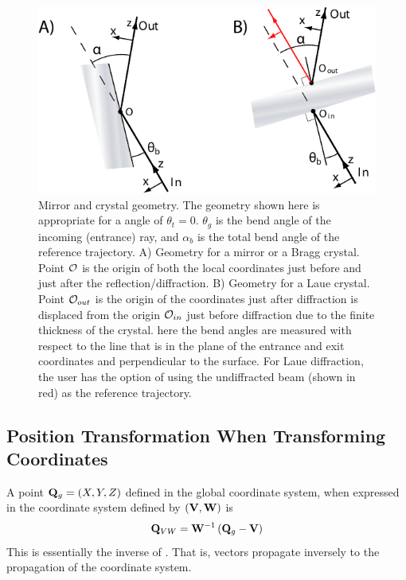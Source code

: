 \begin{figure}
  \centering \includegraphics{mirror.pdf} 
\caption[Mirror and crystal geometry] {Mirror and crystal geometry.  The geometry shown here is
appropriate for a  angle of $\theta_t = 0$.  $\theta_g$ is the bend angle of the
incoming (entrance) ray, and $\alpha_b$ is the total bend angle of the reference trajectory. A)
Geometry for a mirror or a Bragg crystal. Point ${\cal O}$ is the origin of both the local coordinates
just before and just after the reflection/diffraction. B) Geometry for a Laue crystal.  Point
${\cal O}_{out}$ is the origin of the coordinates just after diffraction is displaced from the origin
${\cal O}_{in}$ just before diffraction due to the finite thickness of the crystal. here the bend
angles are measured with respect to the line that is in the plane of the entrance and exit
coordinates and perpendicular to the surface. For Laue diffraction, the user has the option of using
the undiffracted beam (shown in red) as the reference trajectory.
  }  
  \label{f:mirror}
\end{figure}

\subsection{Position Transformation When Transforming Coordinates}
\label{s:pos.trans}

A point ${\bf Q}_g = (X, Y, Z)$ defined in the global coordinate system, when expressed in the
coordinate system defined by $({\bf V}, {\bf W})$ is
\begin{equation}
  {\bf Q}_{VW} = {\bf W}^{-1} \left( {\bf Q}_g - {\bf V} \right)
  \label{rwrv}
\end{equation}
This is essentially the inverse of . That is, vectors propagate inversely to the
propagation of the coordinate system.

